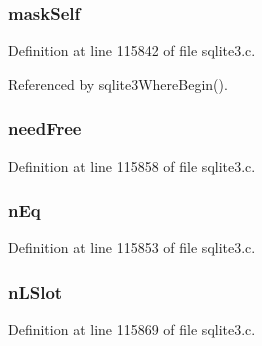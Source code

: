 \hypertarget{struct_where_loop_a64568f8369d027c1d3988c5bcf827126}{}
\subsubsection[{mask\+Self}]{ mask\+Self}\label{struct_where_loop_a64568f8369d027c1d3988c5bcf827126}


Definition at line 115842 of file sqlite3.\+c.



Referenced by sqlite3\+Where\+Begin().

\hypertarget{struct_where_loop_abfb567fa5c6bb71af5013374caef49f7}{}
\subsubsection[{need\+Free}]{ need\+Free}\label{struct_where_loop_abfb567fa5c6bb71af5013374caef49f7}


Definition at line 115858 of file sqlite3.\+c.

\hypertarget{struct_where_loop_ab51e96dea9598ce3eeded5cbe74fecf4}{}
\subsubsection[{n\+Eq}]{ n\+Eq}\label{struct_where_loop_ab51e96dea9598ce3eeded5cbe74fecf4}


Definition at line 115853 of file sqlite3.\+c.

\hypertarget{struct_where_loop_aab25f364e6db92315e55905530d1024d}{}
\subsubsection[{n\+L\+Slot}]{ n\+L\+Slot}\label{struct_where_loop_aab25f364e6db92315e55905530d1024d}


Definition at line 115869 of file sqlite3.\+c.

\hypertarget{struct_where_loop_a7acee2f8f328bc00604d8e56ee00c676}{}
